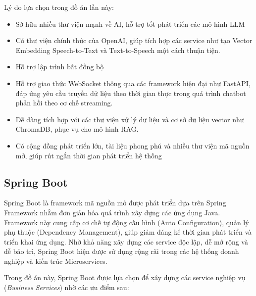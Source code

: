 \documentclass[../DoAn.tex]{subfiles}
\begin{document}
Lý do lựa chọn trong đồ án lần này:
\begin{itemize}
    \item Sở hữu nhiều thư viện mạnh về AI, hỗ trợ tốt phát triển các mô hình LLM
    \item Có thư viện chính thức của OpenAI, giúp tích hợp các service như tạo Vector Embedding Speech-to-Text và Text-to-Speech một cách thuận tiện.
    \item Hỗ trợ lập trình bất đồng bộ
    \item Hỗ trợ giao thức WebSocket thông qua các framework hiện đại như FastAPI, đáp ứng yêu cầu truyền dữ liệu theo thời gian thực trong quá trình chatbot phản hồi theo cơ chế streaming.
    \item Dễ dàng tích hợp với các thư viện xử lý dữ liệu và cơ sở dữ liệu vector như ChromaDB, phục vụ cho mô hình RAG.
    \item Có cộng đồng phát triển lớn, tài liệu phong phú và nhiều thư viện mã nguồn mở, giúp rút ngắn thời gian phát triển hệ thống
\end{itemize}

\subsection{Spring Boot}

Spring Boot là framework mã nguồn mở được phát triển dựa trên Spring Framework nhằm đơn giản hóa quá trình xây dựng các ứng dụng Java. Framework này cung cấp cơ chế tự động cấu hình (Auto Configuration), quản lý phụ thuộc (Dependency Management), giúp giảm đáng kể thời gian phát triển và triển khai ứng dụng. Nhờ khả năng xây dựng các service độc lập, dễ mở rộng và dễ bảo trì, Spring Boot hiện được sử dụng rộng rãi trong các hệ thống doanh nghiệp và kiến trúc Microservices.

Trong đồ án này, Spring Boot được lựa chọn để xây dựng các service nghiệp vụ (\textit{Business Services}) nhờ các ưu điểm sau:
\end{document}
